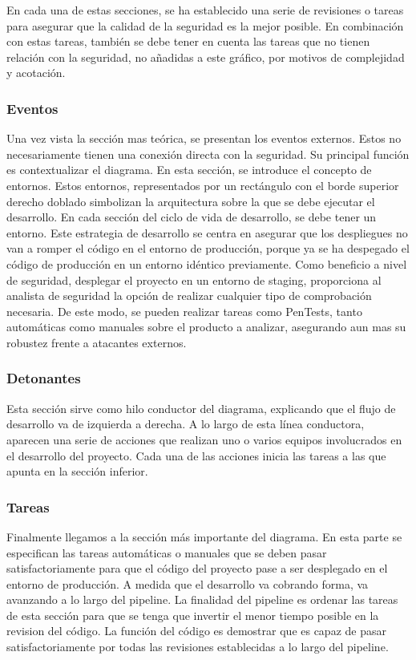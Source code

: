 \documentclass[12pt]{report} %
\begin{document}
En cada una de estas secciones, se ha establecido una serie de revisiones o
tareas para asegurar que la calidad de la seguridad es la mejor posible.  En
combinación con estas tareas, también se debe tener en cuenta las tareas que no
tienen relación con la seguridad, no añadidas a este gráfico, por motivos de
complejidad y acotación.

\subsubsection{Eventos}

Una vez vista la sección mas teórica, se presentan los eventos externos.  Estos
no necesariamente tienen una conexión directa con la seguridad.  Su principal
función es contextualizar el diagrama.  En esta sección, se introduce el
concepto de entornos.  Estos entornos, representados por un rectángulo con el
borde superior derecho doblado simbolizan la arquitectura sobre la que se debe
ejecutar el desarrollo.  En cada sección del ciclo de vida de desarrollo, se
debe tener un entorno.  Este estrategia de desarrollo se centra en asegurar que
los despliegues no van a romper el código en el entorno de producción, porque ya
se ha despegado el código de producción en un entorno idéntico previamente.
Como beneficio a nivel de seguridad, desplegar el proyecto en un entorno de
staging, proporciona al analista de seguridad la opción de realizar cualquier
tipo de comprobación necesaria.  De este modo, se pueden realizar tareas como
\gls{PenTest}s, tanto automáticas como manuales sobre el producto a analizar,
asegurando aun mas su robustez frente a atacantes externos.

\subsubsection{Detonantes}
 
Esta sección sirve como hilo conductor del diagrama, explicando que el flujo de
desarrollo va de izquierda a derecha.  A lo largo de esta línea conductora,
aparecen una serie de acciones que realizan uno o varios equipos involucrados en
el desarrollo del proyecto.  Cada una de las acciones inicia las tareas a las
que apunta en la sección inferior.

\subsubsection{Tareas}

Finalmente llegamos a la sección más importante del diagrama.  En esta parte se
especifican las tareas automáticas o manuales que se deben pasar
satisfactoriamente para que el código del proyecto pase a ser desplegado en el
entorno de producción.  A medida que el desarrollo va cobrando forma, va
avanzando a lo largo del \gls{pipeline}.  La finalidad del pipeline es ordenar
las tareas de esta sección para que se tenga que invertir el menor tiempo
posible en la revision del código.  La función del código es demostrar que es
capaz de pasar satisfactoriamente por todas las revisiones establecidas a lo
largo del \gls{pipeline}.
 
\end{document}
